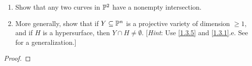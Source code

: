 \label{1.3.7}

\begin{enumerate}[label=(\alph*)]
    \item Show that any two curves in $\P^2$ have a nonempty intersection.

    \item More generally, show that if $Y \subseteq \P^n$ is a projective variety of dimension $\geq 1$, and if $H$ is a hypersurface, then $Y \cap H \neq \emptyset$. [\emph{Hint}: Use \ref{1.3.5} and \ref{1.3.1}.e. See \cite[I.7.2]{hartshorne} for a generalization.]
\end{enumerate}

\begin{proof}

\end{proof}
